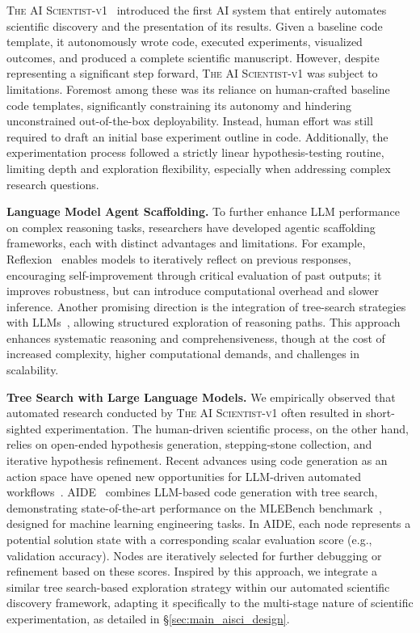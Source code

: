 \documentclass[11pt, a4paper]{include/gdm_format}
\newcommand{\oldalgo}{\textsc{The AI Scientist-v1}\xspace}
\begin{document}
\oldalgo~\citep{lu2024ai} introduced the first AI system that entirely automates scientific discovery and the presentation of its results. Given a baseline code template, it autonomously wrote code, executed experiments, visualized outcomes, and produced a complete scientific manuscript. However, despite representing a significant step forward, \oldalgo was subject to limitations. Foremost among these was its reliance on human-crafted baseline code templates, significantly constraining its autonomy and hindering unconstrained out-of-the-box deployability. Instead, human effort was still required to draft an initial base experiment outline in code. Additionally, the experimentation process followed a strictly linear hypothesis-testing routine, limiting depth and exploration flexibility, especially when addressing complex research questions.

\textbf{Language Model Agent Scaffolding.}
To further enhance LLM performance on complex reasoning tasks, researchers have developed agentic scaffolding frameworks, each with distinct advantages and limitations. For example, Reflexion~\citep{shinn2024reflexion} enables models to iteratively reflect on previous responses, encouraging self-improvement through critical evaluation of past outputs; it improves robustness, but can introduce computational overhead and slower inference. Another promising direction is the integration of tree-search strategies with LLMs~\citep{aide2025}, allowing structured exploration of reasoning paths. This approach enhances systematic reasoning and comprehensiveness, though at the cost of increased complexity, higher computational demands, and challenges in scalability.

\textbf{Tree Search with Large Language Models.}
We empirically observed that automated research conducted by \oldalgo often resulted in short-sighted experimentation. The human-driven scientific process, on the other hand, relies on open-ended hypothesis generation, stepping-stone collection, and iterative hypothesis refinement.
Recent advances using code generation as an action space have opened new opportunities for LLM-driven automated workflows~\citep{wang2024CodeAct}. AIDE~\citep{aide2025} combines LLM-based code generation with tree search, demonstrating state-of-the-art performance on the MLEBench benchmark~\citep{chan2025mlebench}, designed for machine learning engineering tasks. In AIDE, each node represents a potential solution state with a corresponding scalar evaluation score (e.g., validation accuracy). Nodes are iteratively selected for further debugging or refinement based on these scores. Inspired by this approach, we integrate a similar tree search-based exploration strategy within our automated scientific discovery framework, adapting it specifically to the multi-stage nature of scientific experimentation, as detailed in \S\ref{sec:main_aisci_design}.
\end{document}
